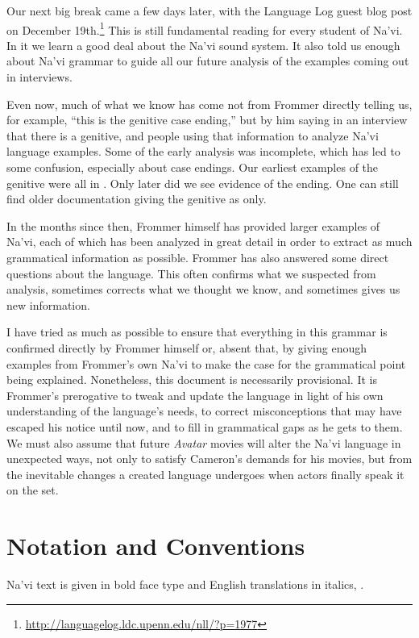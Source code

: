 Our next big break came a few days later, with the Language Log guest
blog post on December
19th.\footnote{\url{http://languagelog.ldc.upenn.edu/nll/?p=1977}}
This is still fundamental reading for every student of Na'vi.  In it
we learn a good deal about the Na'vi sound system.  It also told us
enough about Na'vi grammar to guide all our future analysis of
the examples coming out in interviews.

Even now, much of what we know has come not from Frommer directly
telling us, for example, ``this is the genitive case ending,'' but by
him saying in an interview that there is a genitive, and people using
that information to analyze Na'vi language examples.  Some of the
early analysis was incomplete, which has led to some confusion,
especially about case endings.  Our earliest examples of the genitive
were all in .  Only later did we see evidence of the 
ending.  One can still find older documentation giving the genitive as
 only.

In the months since then, Frommer himself has provided larger examples
of Na'vi, each of which has been analyzed in great detail in order to
extract as much grammatical information as possible.  Frommer has also
answered some direct questions about the language.  This often
confirms what we suspected from analysis, sometimes corrects what we
thought we know, and sometimes gives us new information.

I have tried as much as possible to ensure that everything in this
grammar is confirmed directly by Frommer himself or, absent that, by
giving enough examples from Frommer's own Na'vi to make the case for
the grammatical point being explained.  Nonetheless, this document is
necessarily provisional.  It is Frommer's prerogative to tweak and
update the language in light of his own understanding of the
language's needs, to correct misconceptions that may have escaped his
notice until now, and to fill in grammatical gaps as he gets to them.
We must also assume that future \textit{Avatar} movies will alter the
Na'vi language in unexpected ways, not only to satisfy Cameron's
demands for his movies, but from the inevitable changes a created
language undergoes when actors finally speak it on the set.


\section{Notation and Conventions}

Na'vi text is given in bold face type and English translations in
italics,  .

